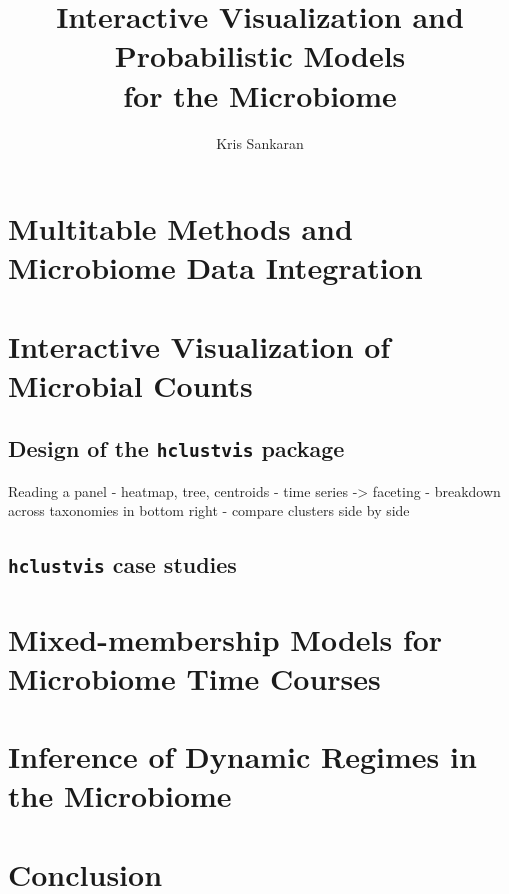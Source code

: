 \documentclass{report}
\title{Interactive Visualization and Probabilistic Models \\
  for the Microbiome}
\author{Kris Sankaran}
\begin{document}
\maketitle
\tableofcontents

\chapter{Multitable Methods and Microbiome Data Integration}

\chapter{Interactive Visualization of Microbial Counts}

\section{Design of the \texttt{hclustvis} package}

Reading a panel
- heatmap, tree, centroids
- time series -> faceting
- breakdown across taxonomies in bottom right
- compare clusters side by side

\section{\texttt{hclustvis} case studies}

\chapter{Mixed-membership Models for Microbiome Time Courses}
\chapter{Inference of Dynamic Regimes in the Microbiome}
\chapter{Conclusion}



\end{document}
